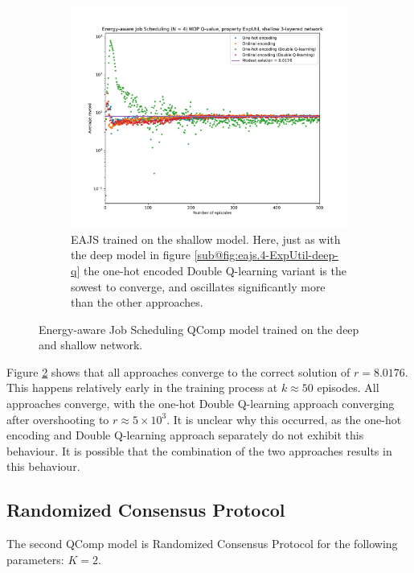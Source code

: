 \begin{figure}
\begin{subfigure}[b]{0.9\textwidth}
        \includegraphics[width=\textwidth]{plot/eajs.4-ExpUtil-fc128-q.pdf}
        \caption{EAJS trained on the shallow model. Here, just as with the deep model in figure \ref{sub@fig:eajs.4-ExpUtil-deep-q} the one-hot encoded Double Q-learning variant is the sowest to converge, and oscillates significantly more than the other approaches.}
        \label{fig:eajs.4-ExpUtil-shallow-q}
    \end{subfigure}
    \caption{Energy-aware Job Scheduling QComp model trained on the deep and shallow network.}
    \label{fig:eajs.4-ExpUtil-q}
\end{figure}

Figure \ref{fig:eajs.4-ExpUtil-q} shows that all approaches converge to the correct solution of $r = 8.0176$. This happens relatively early in the training process at $k \approx 50$ episodes. All approaches converge, with the one-hot Double Q-learning approach converging after overshooting to $r \approx 5 \times 10^3$. It is unclear why this occurred, as the one-hot encoding and Double Q-learning approach separately do not exhibit this behaviour. It is possible that the combination of the two approaches results in this behaviour.

\subsection{Randomized Consensus Protocol}

The second QComp model is Randomized Consensus Protocol for the following parameters: $K = 2$.

